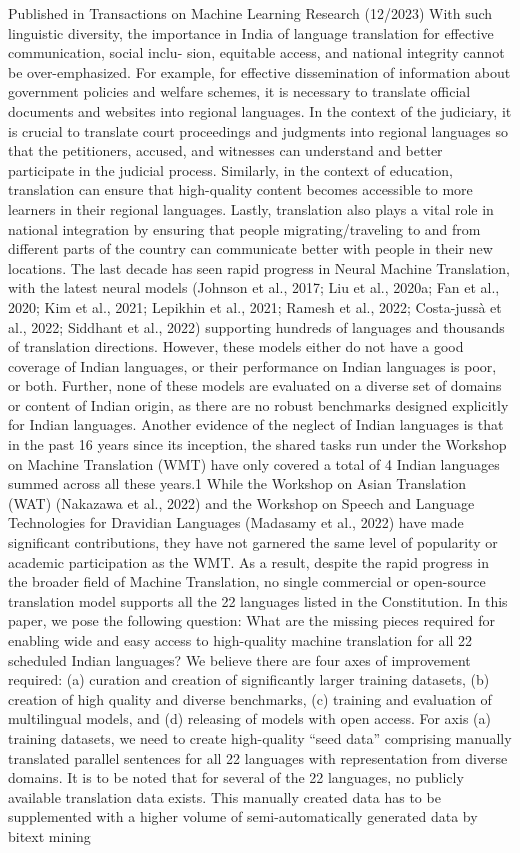 Published in Transactions on Machine Learning Research (12/2023) With such linguistic diversity, the importance in India of language translation for effective communication, social inclu- sion, equitable access, and national integrity cannot be over-emphasized. For example, for effective dissemination of information about government policies and welfare schemes, it is necessary to translate oﬀicial documents and websites into regional languages. In the context of the judiciary, it is crucial to translate court proceedings and judgments into regional languages so that the petitioners, accused, and witnesses can understand and better participate in the judicial process. Similarly, in the context of education, translation can ensure that high-quality content becomes accessible to more learners in their regional languages. Lastly, translation also plays a vital role in national integration by ensuring that people migrating/traveling to and from different parts of the country can communicate better with people in their new locations. The last decade has seen rapid progress in Neural Machine Translation, with the latest neural models (Johnson et al., 2017; Liu et al., 2020a; Fan et al., 2020; Kim et al., 2021; Lepikhin et al., 2021; Ramesh et al., 2022; Costa-jussà et al., 2022; Siddhant et al., 2022) supporting hundreds of languages and thousands of translation directions. However, these models either do not have a good coverage of Indian languages, or their performance on Indian languages is poor, or both. Further, none of these models are evaluated on a diverse set of domains or content of Indian origin, as there are no robust benchmarks designed explicitly for Indian languages. Another evidence of the neglect of Indian languages is that in the past 16 years since its inception, the shared tasks run under the Workshop on Machine Translation (WMT) have only covered a total of 4 Indian languages summed across all these years.1 While the Workshop on Asian Translation (WAT) (Nakazawa et al., 2022) and the Workshop on Speech and Language Technologies for Dravidian Languages (Madasamy et al., 2022) have made significant contributions, they have not garnered the same level of popularity or academic participation as the WMT. As a result, despite the rapid progress in the broader field of Machine Translation, no single commercial or open-source translation model supports all the 22 languages listed in the Constitution. In this paper, we pose the following question: What are the missing pieces required for enabling wide and easy access to high-quality machine translation for all 22 scheduled Indian languages? We believe there are four axes of improvement required: (a) curation and creation of significantly larger training datasets, (b) creation of high quality and diverse benchmarks, (c) training and evaluation of multilingual models, and (d) releasing of models with open access. For axis (a) training datasets, we need to create high-quality “seed data” comprising manually translated parallel sentences for all 22 languages with representation from diverse domains. It is to be noted that for several of the 22 languages, no publicly available translation data exists. This manually created data has to be supplemented with a higher volume of semi-automatically generated data by bitext mining 